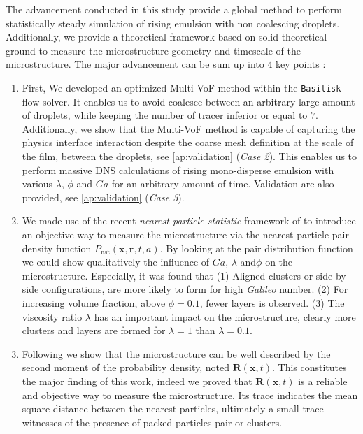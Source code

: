 The advancement conducted in this study provide a global method to perform statistically steady simulation of rising emulsion with non coalescing droplets.
Additionally, we provide a theoretical framework based on solid theoretical ground to measure the microstructure geometry and timescale of the microstructure.
The major advancement can be sum up into 4 key points :
\begin{enumerate}
    \item First, We developed an optimized Multi-VoF method within the \texttt{Basilisk} flow solver. 
    It enables us to avoid coalesce between an arbitrary large amount of droplets, while keeping the number of tracer inferior or equal to $7$. 
    Additionally, we show that the Multi-VoF method is capable of capturing the physics interface interaction despite the coarse mesh definition at the scale of the film, between the droplets, see \ref{ap:validation} (\textit{Case 2}). 
    This enables us to perform massive DNS calculations of rising mono-disperse emulsion with various $\lambda$, $\phi$ and $Ga$ for an arbitrary amount of time.
    Validation are also provided, see \ref{ap:validation} (\textit{Case 3}).  
    \item We made use of the recent \textit{nearest particle statistic} framework of \citet{zhang2023evolution} to introduce an objective way to measure the microstructure via the nearest particle pair density function $P_\text{nst}(\textbf{x},\textbf{r},t,a)$. 
    By looking at the pair distribution function we could show qualitatively the influence of $Ga$, $\lambda$ and$\phi$ on the microstructure.
    Especially, it was found that (1) Aligned clusters or side-by-side configurations, are more likely to form for high \textit{Galileo} number. (2) For increasing volume fraction, above $\phi = 0.1$, fewer layers is observed. (3) The viscosity ratio $\lambda$ has an important impact on the microstructure, clearly more  clusters and layers are formed for $\lambda = 1$ than $\lambda = 0.1$. 
    \item Following \citet{zhang2023evolution} we show that the microstructure can be well described by the second moment of the probability density, noted $\textbf{R}(\textbf{x},t)$. 
    This constitutes the major finding of this work, indeed we proved that $\textbf{R}(\textbf{x},t)$ is a reliable and objective way to measure the microstructure.
    Its trace indicates the mean square distance between the nearest particles, ultimately a small trace witnesses of the presence of packed particles pair or clusters.

\end{enumerate}
